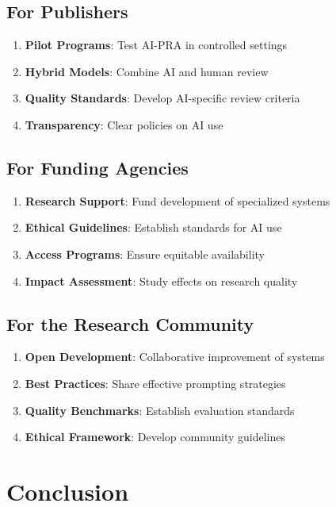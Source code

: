 \documentclass[11pt,a4paper]{article}
\begin{document}
\subsection{For Publishers}

\begin{enumerate}
    \item \textbf{Pilot Programs}: Test AI-PRA in controlled settings
    \item \textbf{Hybrid Models}: Combine AI and human review
    \item \textbf{Quality Standards}: Develop AI-specific review criteria
    \item \textbf{Transparency}: Clear policies on AI use
\end{enumerate}

\subsection{For Funding Agencies}

\begin{enumerate}
    \item \textbf{Research Support}: Fund development of specialized systems
    \item \textbf{Ethical Guidelines}: Establish standards for AI use
    \item \textbf{Access Programs}: Ensure equitable availability
    \item \textbf{Impact Assessment}: Study effects on research quality
\end{enumerate}

\subsection{For the Research Community}

\begin{enumerate}
    \item \textbf{Open Development}: Collaborative improvement of systems
    \item \textbf{Best Practices}: Share effective prompting strategies
    \item \textbf{Quality Benchmarks}: Establish evaluation standards
    \item \textbf{Ethical Framework}: Develop community guidelines
\end{enumerate}

\section{Conclusion}
\end{document}
